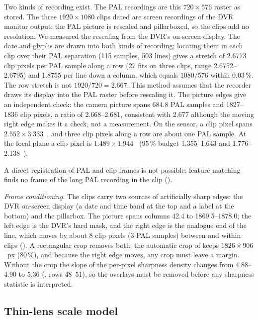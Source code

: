 Two kinds of recording exist. The PAL recordings are this $720 \times 576$ raster as stored. The three
$1920 \times 1080$ clips dated  are screen recordings of the DVR monitor output: the PAL picture is
rescaled and pillarboxed, so the clips add no resolution. We measured the rescaling from the DVR's on-screen display.
The date and  glyphs are drawn into both kinds of recording; locating them in each clip over their PAL
separation (115 samples, 503 lines) gives a stretch of 2.6773 clip pixels per PAL sample along a row (27 fits on three
clips, range 2.6752--2.6795) and 1.8755 per line down a column, which equals $1080/576$ within 0.03\,\%. The row
stretch is not $1920/720 = 2.667$. This method assumes that the recorder draws its display into the PAL raster before
rescaling it. The picture edges give an independent check: the camera picture spans 684.8 PAL samples and 1827--1836
clip pixels, a ratio of 2.668--2.681, consistent with 2.677 although the moving right edge makes it a check, not a
measurement. On the sensor, a clip pixel spans $2.552 \times 3.333$~\um, and three clip pixels along a row are about
one PAL sample. At the focal plane a clip pixel is $1.489 \times 1.944$~\um{} (95\,\% budget 1.355--1.643 and
1.776--2.138~\um).

A direct registration of PAL and clip frames is not possible: feature matching finds no frame of the long PAL
recording in the clip  ().

\emph{Frame conditioning.} The clips carry two sources of artificially sharp edges: the DVR on-screen display (a date
and time band at the top and a  label at the bottom) and the pillarbox. The picture spans columns 42.4 to
1869.5--1878.0; the left edge is the DVR's hard mask, and the right edge is the analogue end of the line, which moves
by about 8 clip pixels (3 PAL samples) between and within clips (). A rectangular
crop removes both; the automatic crop of  keeps $1826 \times 906$~px (80\,\%), and
because the right edge moves, any crop must leave a margin. Without the crop the slope of the per-pixel sharpness
density changes from 4.88--4.90 to 5.36 (, rows 48--51), so the overlays must be
removed before any sharpness statistic is interpreted.

\subsection{Thin-lens scale model}\label{sec:thinlens}

